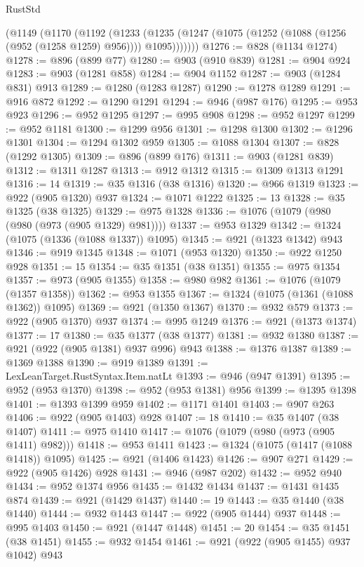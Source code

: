 \begin{lexlean}{RustStd}
\begin{coremodule}
    (@1149
      (@1170
        (@1192
          (@1233 (@1235 (@1247 (@1075 (@1252 (@1088 (@1256 (@952 (@1258 @1259) @956)))) @1095)))))))
@1276 := @828 (@1134 @1274)
@1278 := @896 (@899 @77)
@1280 := @903 (@910 @839)
@1281 := @904 @924
@1283 := @903 (@1281 @858)
@1284 := @904 @1152
@1287 := @903 (@1284 @831) @913
@1289 := @1280 (@1283 @1287)
@1290 := @1278 @1289
@1291 := @916 @872
@1292 := @1290 @1291
@1294 := @946 (@987 @176)
@1295 := @953 @923
@1296 := @952 @1295
@1297 := @995 @908
@1298 := @952 @1297
@1299 := @952 @1181
@1300 := @1299 @956
@1301 := @1298 @1300
@1302 := @1296 @1301
@1304 := @1294 @1302 @959
@1305 := @1088 @1304
@1307 := @828 (@1292 @1305)
@1309 := @896 (@899 @176)
@1311 := @903 (@1281 @839)
@1312 := @1311 @1287
@1313 := @912 @1312
@1315 := @1309 @1313 @1291
@1316 := 14
@1319 := @35 @1316 (@38 @1316)
@1320 := @966 @1319
@1323 := @922 (@905 @1320) @937
@1324 := @1071 @1222
@1325 := 13
@1328 := @35 @1325 (@38 @1325)
@1329 := @975 @1328
@1336 := @1076 (@1079 (@980 (@980 (@973 (@905 @1329) @981))))
@1337 := @953 @1329
@1342 := @1324 (@1075 (@1336 (@1088 @1337)) @1095)
@1345 := @921 (@1323 @1342) @943
@1346 := @919 @1345
@1348 := @1071 (@953 @1320)
@1350 := @922 @1250 @928
@1351 := 15
@1354 := @35 @1351 (@38 @1351)
@1355 := @975 @1354
@1357 := @973 (@905 @1355)
@1358 := @980 @982
@1361 := @1076 (@1079 (@1357 @1358))
@1362 := @953 @1355
@1367 := @1324 (@1075 (@1361 (@1088 @1362)) @1095)
@1369 := @921 (@1350 @1367)
@1370 := @932 @579
@1373 := @922 (@905 @1370) @937
@1374 := @995 @1249
@1376 := @921 (@1373 @1374)
@1377 := 17
@1380 := @35 @1377 (@38 @1377)
@1381 := @932 @1380
@1387 := @921 (@922 (@905 @1381) @937 @996) @943
@1388 := @1376 @1387
@1389 := @1369 @1388
@1390 := @919 @1389
@1391 := LexLeanTarget.RustSyntax.Item.natLt
@1393 := @946 (@947 @1391)
@1395 := @952 (@953 @1370)
@1398 := @952 (@953 @1381) @956
@1399 := @1395 @1398
@1401 := @1393 @1399 @959
@1402 := @1171 @1401
@1403 := @907 @263
@1406 := @922 (@905 @1403) @928
@1407 := 18
@1410 := @35 @1407 (@38 @1407)
@1411 := @975 @1410
@1417 := @1076 (@1079 (@980 (@973 (@905 @1411) @982)))
@1418 := @953 @1411
@1423 := @1324 (@1075 (@1417 (@1088 @1418)) @1095)
@1425 := @921 (@1406 @1423)
@1426 := @907 @271
@1429 := @922 (@905 @1426) @928
@1431 := @946 (@987 @202)
@1432 := @952 @940
@1434 := @952 @1374 @956
@1435 := @1432 @1434
@1437 := @1431 @1435 @874
@1439 := @921 (@1429 @1437)
@1440 := 19
@1443 := @35 @1440 (@38 @1440)
@1444 := @932 @1443
@1447 := @922 (@905 @1444) @937
@1448 := @995 @1403
@1450 := @921 (@1447 @1448)
@1451 := 20
@1454 := @35 @1451 (@38 @1451)
@1455 := @932 @1454
@1461 := @921 (@922 (@905 @1455) @937 @1042) @943

\end{coremodule}
\end{lexlean}
